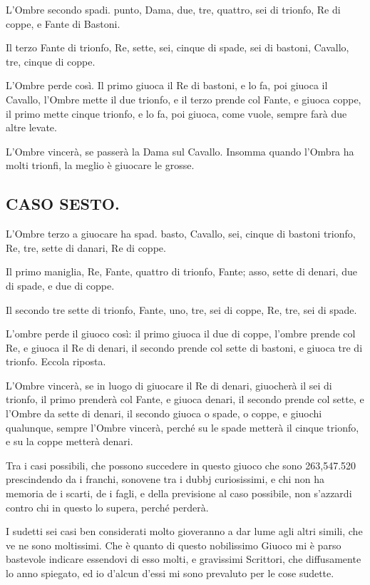 \documentclass[11pt,a6paper]{article}
\begin{document}
L'Ombre secondo spadi. punto, Dama,
due, tre, quattro, sei di trionfo, Re di
coppe, e Fante di Bastoni.

Il terzo Fante di trionfo, Re, sette, sei,
cinque di spade, sei di bastoni, Cavallo,
tre, cinque di coppe.

L'Ombre perde così. Il primo giuoca il
Re di bastoni, e lo fa, poi giuoca il Cavallo,
l'Ombre mette il due trionfo, e il terzo
prende col Fante, e giuoca coppe, il primo
mette cinque trionfo, e lo fa, poi giuoca,
come vuole, sempre farà due altre levate.

L'Ombre vincerà, se passerà la Dama sul
Cavallo. Insomma quando l'Ombra ha molti
trionfi, la meglio è giuocare le grosse.

\subsection{CASO SESTO.}

L'Ombre terzo a giuocare ha spad. basto,
Cavallo, sei, cinque di bastoni trionfo,
Re, tre, sette di danari, Re di coppe.

Il primo maniglia, Re, Fante, quattro di
trionfo, Fante; asso, sette di denari, due di
spade, e due di coppe.

Il secondo tre sette di trionfo, Fante,
uno, tre, sei di coppe, Re, tre, sei di spade.

L'ombre perde il giuoco così: il primo
giuoca il due di coppe, l'ombre prende col
Re, e giuoca il Re di denari, il secondo
prende col sette di bastoni, e giuoca tre di
trionfo. Eccola riposta.

L'Ombre vincerà, se in luogo di giuocare
il Re di denari, giuocherà il sei di trionfo,
il primo prenderà col Fante, e giuoca denari,
il secondo prende col sette, e l'Ombre da
sette di denari, il secondo giuoca o spade, o
coppe, e giuochi qualunque, sempre l'Ombre
vincerà, perché su le spade metterà il cinque
trionfo, e su la coppe metterà denari.

Tra i casi possibili, che possono succedere
in questo giuoco che sono 263,547.520 prescindendo
da i franchi, sonovene tra i dubbj
curiosissimi, e chi non ha memoria de i scarti,
de i fagli, e della previsione al caso possibile,
non s'azzardi contro chi in questo lo supera,
perché perderà.

I sudetti sei casi ben considerati molto
gioveranno a dar lume agli altri simili, che ve
ne sono moltissimi. Che è quanto di questo
nobilissimo Giuoco mi è parso bastevole indicare
essendovi di esso molti, e gravissimi
Scrittori, che diffusamente lo anno spiegato,
ed io d'alcun d'essi mi sono prevaluto per le
cose sudette.
\end{document}
